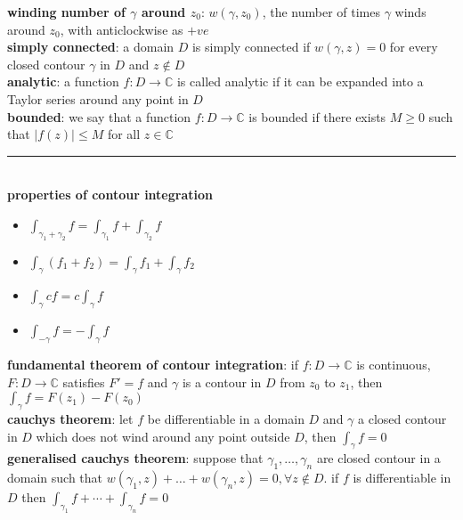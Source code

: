 \documentclass[a4paper]{article}
\newcommand*\abs[1]{\vert #1 \vert}
\newcommand*\linesep[0]{\noindent\rule{\textwidth}{0.5pt}\\}
\begin{document}
\begin{framed}
	\noindent
	\textbf{winding number of $\gamma$ around $z_0$}: $w(\gamma, z_0)$, the number of times $\gamma$ winds around $z_0$, with anticlockwise as $+ve$\\
	
	\noindent
	\textbf{simply connected}: a domain $D$ is simply connected if $w(\gamma, z) = 0$ for every closed contour $\gamma$ in $D$ and $z \notin D$\\
	
	\noindent
	\textbf{analytic}: a function $f: D \rightarrow \mathbb{C}$ is called analytic if it can be expanded into a Taylor series around any point in $D$\\
	
	\noindent
	\textbf{bounded}: we say that a function $f: D \rightarrow \mathbb{C}$ is bounded if there exists $M \geq 0$ such that $\abs{f(z)} \leq M$ for all $z \in \mathbb{C}$
	
	\linesep
	
	\noindent
	\textbf{properties of contour integration}
	\begin{multicols}{2}
		\begin{itemize}
			\item $\int_{\gamma_1 + \gamma_2} f = \int_{\gamma_1} f + \int_{\gamma_2} f$
			\item $\int_\gamma (f_1 + f_2) = \int_\gamma f_1 + \int_\gamma f_2$
			\item $\int_\gamma cf = c \int_\gamma f$
			\item $\int_{-\gamma} f = - \int_\gamma f$
		\end{itemize}
	\end{multicols}
	
	\noindent
	\textbf{fundamental theorem of contour integration}: if $f: D \rightarrow \mathbb{C}$ is continuous, $F: D \rightarrow \mathbb{C}$ satisfies $F' = f$ and $\gamma$ is a contour in $D$ from $z_0$ to $z_1$, then $\int_\gamma f = F(z_1) - F(z_0)$\\
	
	\noindent
	\textbf{cauchys theorem}: let $f$ be differentiable in a domain $D$ and $\gamma$ a closed contour in $D$ which does not wind around any point outside $D$, then $\int_\gamma f = 0$\\
	
	\noindent
	\textbf{generalised cauchys theorem}: suppose that $\gamma_1, \dots, \gamma_n$ are closed contour in a domain such that $w(\gamma_1, z) + \dots + w(\gamma_n, z) = 0, \forall z \notin D$. if $f$ is differentiable in $D$ then $\int_{\gamma_1} f + \cdots + \int_{\gamma_n} f = 0$\\
	

\end{framed}
\end{document}
